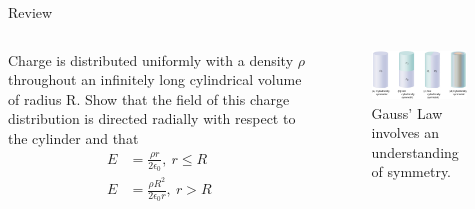 \documentclass{beamer}
\begin{document}
\begin{frame}{Review}
\begin{columns}[T]
\begin{column}{0.4\textwidth}
\small
Charge is distributed uniformly with a density $\rho$ throughout an infinitely long cylindrical volume of radius R. Show that the field of this charge distribution is directed radially with respect to the cylinder and that
\begin{align}
E &= \frac{\rho r}{2\epsilon_0}, ~ r\leq R\\
E &= \frac{\rho R^2}{2\epsilon_0 r}, ~ r>R
\end{align}
\end{column}
\begin{column}{0.6\textwidth}
\begin{figure}
\centering
\includegraphics[width=0.95\textwidth]{cyl.jpeg}
\caption{\label{fig:cyl} Gauss' Law involves an understanding of symmetry.}
\end{figure}
\end{column}
\end{columns}
\end{frame}
\end{document}

